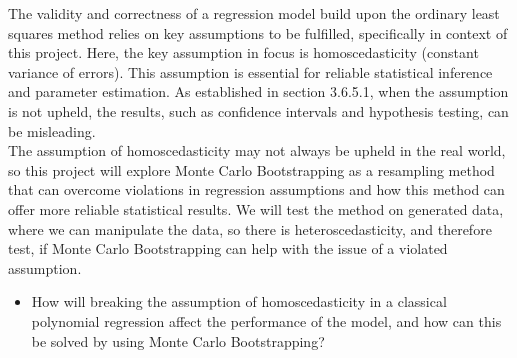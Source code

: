 \label{sec:PBS}

The validity and correctness of a regression model build upon the ordinary least squares method relies on key assumptions to be fulfilled, specifically in context of this project. Here, the key assumption in focus is homoscedasticity (constant variance of errors). This assumption is essential for reliable statistical inference and parameter estimation. As established in section 3.6.5.1, when the assumption is not upheld, the results, such as confidence intervals and hypothesis testing, can be misleading.\\
The assumption of homoscedasticity may not always be upheld in the real world, so this project will explore Monte Carlo Bootstrapping as a resampling method that can overcome violations in regression assumptions and how this method can offer more reliable statistical results. We will test the method on generated data, where we can manipulate the data, so there is heteroscedasticity, and therefore test, if Monte Carlo Bootstrapping can help with the issue of a violated assumption. 


\begin{itemize}
	\item How will breaking the assumption of homoscedasticity in a classical polynomial regression affect the performance of the model, and how can this be solved by using Monte Carlo Bootstrapping?
\end{itemize}
